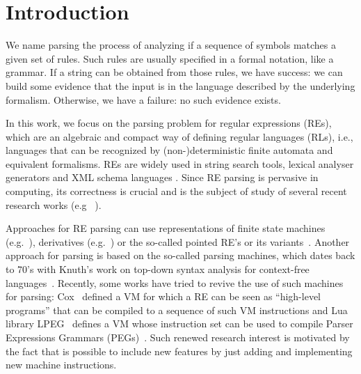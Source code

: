 \documentclass[sigplan]{acmart}
\theoremstyle{definition}
\begin{document}
\section{Introduction}

We name parsing the process of analyzing if a sequence of symbols matches a given set of rules.
Such rules are usually specified in a formal notation, like a grammar. If a string can be obtained
from those rules, we have success: we can build some evidence that the input is in the language
described by the underlying formalism. Otherwise, we have a failure: no such evidence exists.

In this work, we focus on the parsing problem for regular expressions (REs), which are an algebraic
and compact way of defining regular languages (RLs), i.e., languages that can be recognized by
(non-)deterministic finite automata and equivalent formalisms. REs are widely used in string search
tools, lexical analyser generators and XML schema languages \cite{Frisch2004}. Since RE parsing
is pervasive in computing, its correctness is crucial and is the subject of study of several
recent research works (e.g ~\cite{Firsov13,Ribeiro2017,Lopes2016,Asperti10}).

Approaches for RE parsing can use representations of finite state machines (e.g.~\cite{Firsov13}),
derivatives (e.g.~\cite{Ribeiro2017,Lopes2018,Lopes2016}) or the so-called pointed RE's or its
variants~\cite{Asperti10,Fischer2010}. Another approach for parsing is based on the so-called
parsing machines, which dates back to 70's with Knuth's work
on top-down syntax analysis for context-free languages~\cite{Knuth71}. Recently, some works
have tried to revive the use of such machines for parsing: Cox~\cite{Cox2009} defined a VM
for which a RE can be seen as ``high-level programs'' that can be compiled to a sequence of
such VM instructions and Lua library LPEG~\cite{Ierusalimschy2009} defines a VM whose instruction
set can be used to compile Parser Expressions Grammars (PEGs)~\cite{Ford04}. Such renewed research
interest is motivated by the fact that is possible to include new features by just adding and
implementing new machine instructions.
\end{document}
